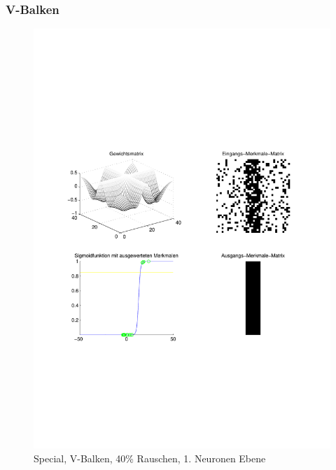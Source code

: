 \subsubsection{V-Balken}
\begin{figure}[hbt]
	\begin{minipage}{0.8 \textwidth}
		\includegraphics[width=\textwidth]{./Bilder/Auswertung/Endergebnis/TypeSpecial_Rauschen40_V_Line_Layer1}
		\caption{Special, V-Balken, 40\% Rauschen, 1. Neuronen Ebene}
		\label{Special_V_40_1}
	\end{minipage}
	\vfill
	\begin{minipage}{0.8 \textwidth}

\end{minipage}
\end{figure}
